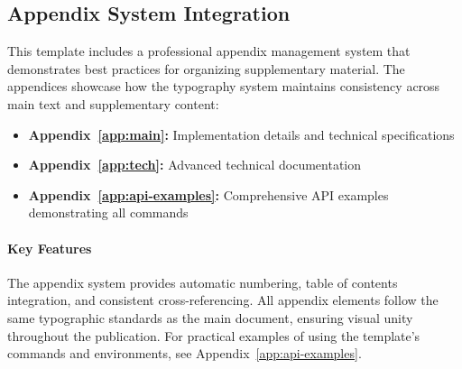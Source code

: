 \documentclass[11pt]{article}
\begin{document}
\subsection{Appendix System Integration}

This template includes a professional appendix management system that demonstrates best practices for organizing supplementary material.
The appendices showcase how the typography system maintains consistency across main text and supplementary content:

\begin{itemize}
  \item \textbf{Appendix~\ref{app:main}:} Implementation details and technical specifications
  \item \textbf{Appendix~\ref{app:tech}:} Advanced technical documentation
  \item \textbf{Appendix~\ref{app:api-examples}:} Comprehensive API examples demonstrating all commands
\end{itemize}

\paragraph{Key Features} The appendix system provides automatic numbering, table of contents integration, and consistent cross-referencing.
All appendix elements follow the same typographic standards as the main document, ensuring visual unity throughout the publication.
For practical examples of using the template's commands and environments, see Appendix~\ref{app:api-examples}.
\startappendices
  
  
  
\finishappendices

\printbibliography
\end{document}
